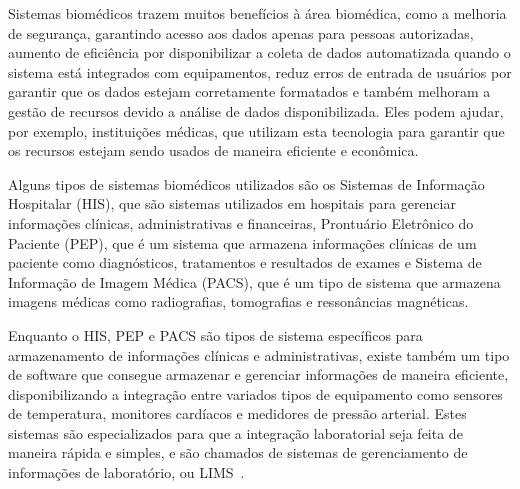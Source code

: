 Sistemas biomédicos trazem muitos benefícios à área biomédica, como a melhoria de segurança, garantindo acesso aos dados apenas para pessoas autorizadas, aumento de eficiência por disponibilizar a coleta de dados automatizada quando o sistema está integrados com equipamentos, reduz erros de entrada de usuários por garantir que os dados estejam corretamente formatados e também melhoram a gestão de recursos devido a análise de dados disponibilizada. Eles podem ajudar, por exemplo, instituições médicas, que utilizam esta tecnologia para garantir que os recursos estejam sendo usados de maneira eficiente e econômica.

Alguns tipos de sistemas biomédicos utilizados são os Sistemas de Informação Hospitalar (HIS), que são sistemas utilizados em hospitais para gerenciar informações clínicas, administrativas e financeiras, Prontuário Eletrônico do Paciente (PEP), que é um sistema que armazena informações clínicas de um paciente como diagnósticos, tratamentos e resultados de exames e Sistema de Informação de Imagem Médica (PACS), que é um tipo de sistema que armazena imagens médicas como radiografias, tomografias e ressonâncias magnéticas.

Enquanto o HIS, PEP e PACS são tipos de sistema específicos para armazenamento de informações clínicas e administrativas, existe também um tipo de software que consegue armazenar e gerenciar informações de maneira eficiente, disponibilizando a integração entre variados tipos de equipamento como sensores de temperatura, monitores cardíacos e medidores de pressão arterial. Estes sistemas são especializados para que a integração laboratorial seja feita de maneira rápida e simples, e são chamados de sistemas de gerenciamento de informações de laboratório, ou LIMS~\cite{Skobelev2011LaboratoryLaboratory}.






